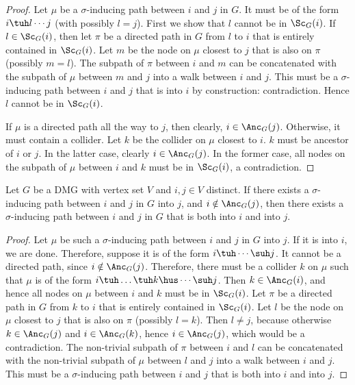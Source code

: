 \begin{proof}
  Let $\mu$ be a $\sigma$-inducing path between $i$ and $j$ in $G$. 
  It must be of the form $i \tuh l \cdots j$ (with possibly $l = j$). 
  First we show that $l$ cannot be in $\Sc_G(i)$.
  If $l \in \Sc_G(i)$, then let $\pi$ be a directed path in $G$ from $l$ to $i$ that is entirely contained in $\Sc_G(i)$.
  Let $m$ be the node on $\mu$ closest to $j$ that is also on $\pi$ (possibly $m = l$).
  The subpath of $\pi$ between $i$ and $m$ can be concatenated with the subpath of $\mu$ between $m$ and $j$ into a walk between $i$ and $j$.
  This must be a $\sigma$-inducing path between $i$ and $j$ that is into $i$ by construction: contradiction.
  Hence $l$ cannot be in $\Sc_G(i)$.

  If $\mu$ is a directed path all the way to $j$, then clearly, $i \in \Anc_G(j)$.
  Otherwise, it must contain a collider. 
  Let $k$ be the collider on $\mu$ closest to $i$.
  $k$ must be ancestor of $i$ or $j$.
  In the latter case, clearly $i \in \Anc_G(j)$.
  In the former case, all nodes on the subpath of $\mu$ between $i$ and $k$ must be in $\Sc_G(i)$, a contradiction.
\end{proof}

\begin{Lem}\label{lem:sigma-inducing_path_into_into}
  Let $G$ be a DMG with vertex set $V$ and $i, j \in V$ distinct.
  If there exists a $\sigma$-inducing path between $i$ and $j$ in $G$ into $j$, and $i \notin \Anc_G(j)$, then there exists a $\sigma$-inducing path between $i$ and $j$ in $G$ that is both into $i$ and into $j$.
\end{Lem}
\begin{proof}
  Let $\mu$ be such a $\sigma$-inducing path between $i$ and $j$ in $G$ into $j$.
  If it is into $i$, we are done.
  Therefore, suppose it is of the form $i \tuh \cdots \suh j$. 
  It cannot be a directed path, since $i \notin \Anc_G(j)$.
  Therefore, there must be a collider $k$ on $\mu$ such that $\mu$ is of the form $i \tuh \dots \tuh k \hus \cdots \suh j$.
  Then $k \in \Anc_G(i)$, and hence all nodes on $\mu$ between $i$ and $k$ must be in $\Sc_G(i)$.
  Let $\pi$ be a directed path in $G$ from $k$ to $i$ that is entirely contained in $\Sc_G(i)$.
  Let $l$ be the node on $\mu$ closest to $j$ that is also on $\pi$ (possibly $l = k$).
  Then $l \ne j$, because otherwise $k \in \Anc_G(j)$ and $i \in \Anc_G(k)$, hence $i \in \Anc_G(j)$, which would be a contradiction.
  The non-trivial subpath of $\pi$ between $i$ and $l$ can be concatenated with the non-trivial subpath of $\mu$ between $l$ and $j$ into a walk between $i$ and $j$.
  This must be a $\sigma$-inducing path between $i$ and $j$ that is both into $i$ and into $j$.
\end{proof}


